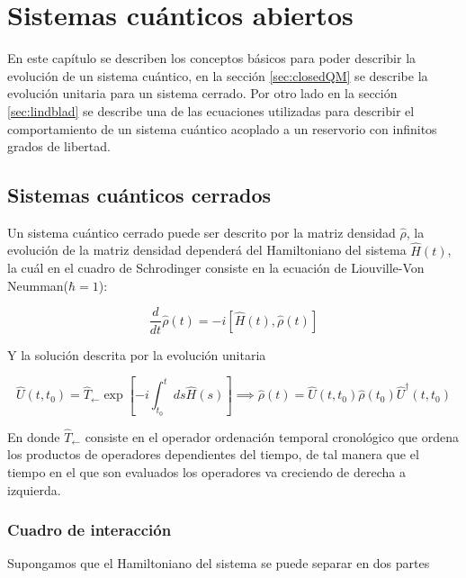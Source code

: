 
\chapter{Sistemas cuánticos abiertos}

En este capítulo se describen los conceptos básicos para poder describir la evolución de un sistema cuántico, en la sección \ref{sec:closedQM} se describe la evolución unitaria para un sistema cerrado.  Por otro lado en la sección \ref{sec:lindblad} se describe una de las ecuaciones utilizadas para describir el comportamiento de un sistema cuántico acoplado a un reservorio con infinitos grados de libertad.


\section{Sistemas cuánticos cerrados}
Un sistema cuántico cerrado puede ser descrito por la matriz densidad $\hat{\rho}$, la evolución de la matriz densidad dependerá del Hamiltoniano del sistema $\hat{H}(t)$, la cuál en el cuadro de Schrodinger consiste en la ecuación de Liouville-Von Neumman($\hbar = 1$)\cite{breuer2002theory}:

\begin{equation*}
    \frac{d}{dt}\hat{\rho}(t) = -i[\hat{H}(t),\hat{\rho}(t)]
\end{equation*}

Y la solución descrita por la evolución unitaria 

\begin{equation*}
    \hat{U}(t,t_{0}) = \hat{T}_{\leftarrow} \exp \left[ -i \int_{t_{0}}^{t}ds \hat{H}(s) \right] \implies \hat{\rho}(t) = \hat{U}(t,t_{0})\hat{\rho}(t_{0})\hat{U}^{\dagger}(t,t_{0})
\end{equation*}

En donde $\hat{T}_{\leftarrow}$ consiste en el operador ordenación temporal cronológico que ordena los productos de operadores dependientes del tiempo, de tal manera que el tiempo en el que son evaluados los operadores va creciendo de derecha a izquierda.

\subsection{Cuadro de interacción}
Supongamos que el Hamiltoniano del sistema se puede separar en dos partes

